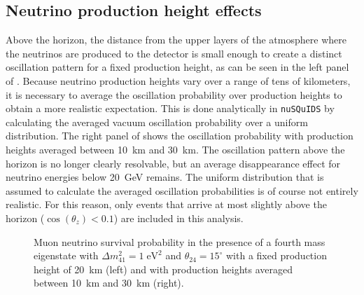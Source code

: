 \subsection{Neutrino production height effects}
Above the horizon, the distance from the upper layers of the atmosphere where the neutrinos are produced to the detector is small enough to create a distinct oscillation pattern for a fixed production height, as can be seen in the left panel of . Because neutrino production heights vary over a range of tens of kilometers, it is necessary to average the oscillation probability over production heights to obtain a more realistic expectation. This is done analytically in \texttt{nuSQuIDS}\cite{squids, nusquids} by calculating the averaged vacuum oscillation probability over a uniform distribution. The right panel of  shows the oscillation probability with production heights averaged between 10~km and 30~km. The oscillation pattern above the horizon is no longer clearly resolvable, but an average disappearance effect for neutrino energies below 20~GeV remains. The uniform distribution that is assumed to calculate the averaged oscillation probabilities is of course not entirely realistic. For this reason, only events that arrive at most slightly above the horizon ($\cos(\theta_z)<0.1$) are included in this analysis.

\begin{figure}
    \centering
    
    \caption{Muon neutrino survival probability in the presence of a fourth mass eigenstate with $\Delta m^2_{41}=1\;\mathrm{eV^2}$ and $\theta_{24}=15^\circ$ with a fixed production height of 20~km (left) and with production heights averaged between 10~km and 30~km (right).\label{fig:numu_survival_1eV2_full_range}}
\end{figure}

